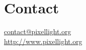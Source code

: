 \chapter{Contact}

\href{mailto:contact@pixellight.org}{contact@pixellight.org}\\
\url{http://www.pixellight.org}\\
